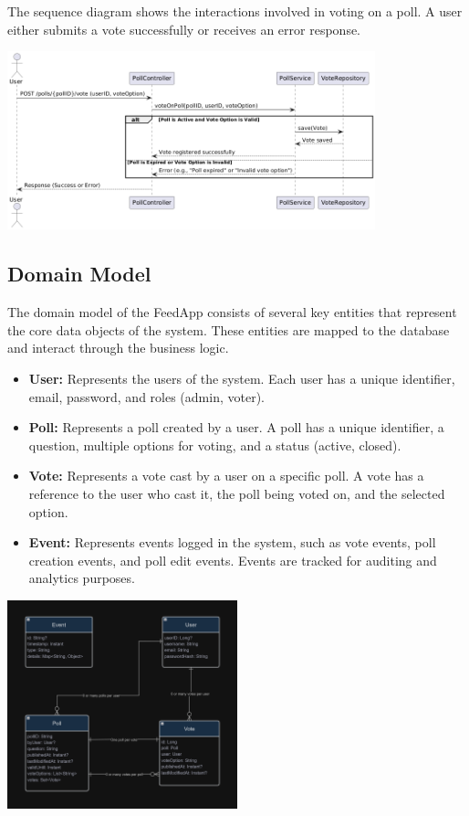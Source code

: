 \vspace{0.2cm}
\noindent The sequence diagram shows the interactions involved in voting on a poll. A user either submits a vote successfully or receives an error response.

\begin{center}
\includegraphics[width=0.8\textwidth]{../images/SequenceDiagramVotingLogic.png}
\end{center}

\subsection{Domain Model}
The domain model of the FeedApp consists of several key entities that represent the core data objects of the system. These entities are mapped to the database and interact through the business logic.
\begin{itemize}
    \item \textbf{User:} Represents the users of the system. Each user has a unique identifier, email, password, and roles (admin, voter).
    \item \textbf{Poll:} Represents a poll created by a user. A poll has a unique identifier, a question, multiple options for voting, and a status (active, closed).
    \item \textbf{Vote:} Represents a vote cast by a user on a specific poll. A vote has a reference to the user who cast it, the poll being voted on, and the selected option.
    \item \textbf{Event:} Represents events logged in the system, such as vote events, poll creation events, and poll edit events. Events are tracked for auditing and analytics purposes.
\end{itemize}

\begin{center}
\includegraphics[width=0.5\textwidth]{./figs/domain-model.png}
\end{center}

